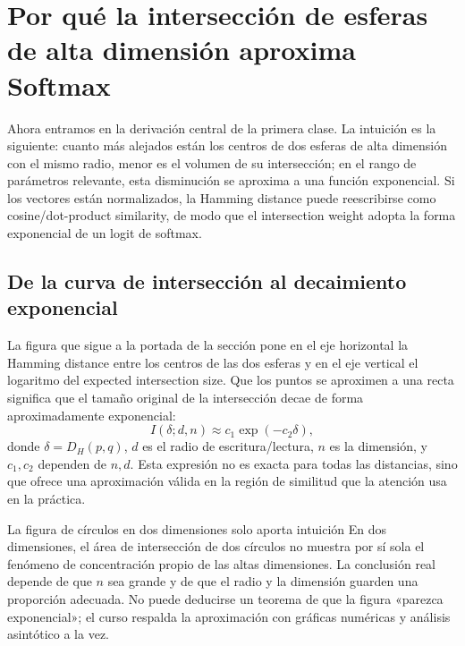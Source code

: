 \section{Por qué la intersección de esferas de alta dimensión aproxima Softmax}

Ahora entramos en la derivación central de la primera clase. La intuición es la siguiente: cuanto más alejados están los centros de dos esferas de alta dimensión con el mismo radio, menor es el volumen de su intersección; en el rango de parámetros relevante, esta disminución se aproxima a una función exponencial. Si los vectores están normalizados, la Hamming distance puede reescribirse como cosine/dot-product similarity, de modo que el intersection weight adopta la forma exponencial de un logit de softmax.

\subsection{De la curva de intersección al decaimiento exponencial}

La figura que sigue a la portada de la sección pone en el eje horizontal la Hamming distance entre los centros de las dos esferas y en el eje vertical el logaritmo del expected intersection size. Que los puntos se aproximen a una recta significa que el tamaño original de la intersección decae de forma aproximadamente exponencial:
$$
I(\delta;d,n)\approx c_1\exp(-c_2\delta),
$$
donde $\delta=D_H(p,q)$, $d$ es el radio de escritura/lectura, $n$ es la dimensión, y $c_1,c_2$ dependen de $n,d$. Esta expresión no es exacta para todas las distancias, sino que ofrece una aproximación válida en la región de similitud que la atención usa en la práctica.



\begin{warningbox}{La figura de círculos en dos dimensiones solo aporta intuición}
En dos dimensiones, el área de intersección de dos círculos no muestra por sí sola el fenómeno de concentración propio de las altas dimensiones. La conclusión real depende de que $n$ sea grande y de que el radio y la dimensión guarden una proporción adecuada. No puede deducirse un teorema de que la figura «parezca exponencial»; el curso respalda la aproximación con gráficas numéricas y análisis asintótico a la vez.
\end{warningbox}

